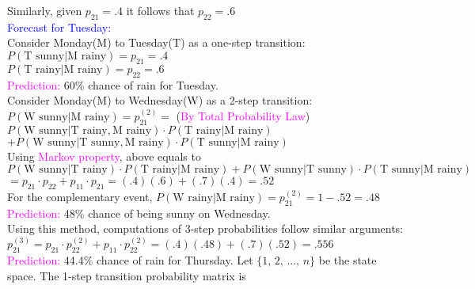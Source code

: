 \documentclass[20pt,landscape]{foils}
\newcommand{\no}{\noindent}
\begin{document}
Similarly, given $p_{21}=.4$ it follows that $p_{22}=.6$\\[.15in]
{\textcolor{blue}{Forecast for Tuesday:}}\\[.1in]
Consider Monday(M) to Tuesday(T) as a one-step transition:\\[.1in]
\hspace*{1in} $P(\text{T sunny}|\text{M rainy})=p_{21}=.4$\\[.1in]
\hspace*{1in} $P(\text{T rainy}|\text{M rainy})=p_{22}=.6$\\[.1in]
{\textcolor{magenta}{Prediction:}} 60\% chance of rain for Tuesday.
\newpage
\no {\textcolor{blue}{Forecast for Wednesday:}}\\[.01in]
Consider Monday(M) to Wednesday(W) as a 2-step transition:\\[.1in]
$P(\text{W sunny}|\text{M rainy})=p_{21}^{(2)}=$ ({\textcolor{magenta}{By Total Probability Law}})\\[.1in]
\hspace*{1in} $P(\text{W sunny}|\text{T rainy},\text{M rainy})\cdot P(\text{T rainy}|\text{M rainy})$\\
\hspace*{2.5in} $+P(\text{W sunny}|\text{T sunny},\text{M rainy})\cdot P(\text{T sunny}|\text{M rainy})$ \\[.1in]
\no Using {\textcolor{magenta}{Markov property}}, above equals to\\[.1in]
{\small $P(\text{W sunny}|\text{T rainy})\cdot P(\text{T rainy}|\text{M rainy})+P(\text{W sunny}|\text{T sunny})\cdot P(\text{T sunny}|\text{M rainy})$} \\[.1in]
\hspace*{1.5in} $=p_{21}\cdot p_{22}+p_{11} \cdot p_{21}=(.4)(.6)+(.7)(.4)=.52$\\[.1in]
For the complementary event, $P(\text{W rainy}|\text{M rainy})=p_{21}^{(2)}=1-.52=.48$\\[.1in]
{\textcolor{magenta}{Prediction:}} 48\% chance of being sunny on Wednesday.\\[.1in]
Using this method, computations of 3-step probabilities follow similar arguments:
$p_{21}^{(3)}=p_{21}\cdot p_{22}^{(2)}+p_{11} \cdot p_{22}^{(2)}=(.4)(.48)+(.7)(.52)=.556$\\[.1in]
{\textcolor{magenta}{Prediction:}} 44.4\% chance of rain for Thursday.
\foilhead[-.8in]{\textcolor{blue}{Transition Probability Matrix}} 
\no Let $\{1,\,2,\,...,\, n\}$ be the state space. The 1-step
transition probability matrix is
\end{document}
